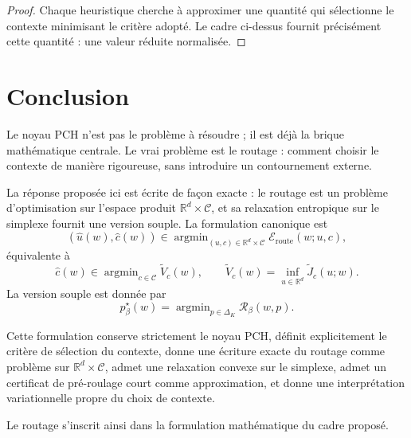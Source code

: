 \documentclass[11pt,a4paper]{article}
\DeclareMathOperator{\argmin}{argmin}
\newcommand{\R}{\mathbb R}
\newcommand{\Ccal}{\mathcal C}
\newcommand{\Rcal}{\mathcal R}
\begin{document}
\begin{proof}
Chaque heuristique cherche à approximer une quantité qui sélectionne le contexte minimisant le critère adopté. Le cadre ci-dessus fournit précisément cette quantité : une valeur réduite normalisée.
\end{proof}

\section{Conclusion}

Le noyau PCH n'est pas le problème à résoudre ; il est déjà la brique mathématique centrale. Le vrai problème est le routage : comment choisir le contexte de manière rigoureuse, sans introduire un contournement externe.

La réponse proposée ici est écrite de façon exacte : le routage est un problème d'optimisation sur l'espace produit \(\R^d\times\Ccal\), et sa relaxation entropique sur le simplexe fournit une version souple. La formulation canonique est
\[
(\hat u(w),\hat c(w))\in\argmin_{(u,c)\in\R^d\times\Ccal}\mathcal E_{\mathrm{route}}(w;u,c),
\]
équivalente à
\[
\hat c(w)\in\argmin_{c\in\Ccal}\widetilde V_c(w),
\qquad
\widetilde V_c(w)=\inf_{u\in\R^d}\widetilde J_c(u;w).
\]
La version souple est donnée par
\[
p^\star_\beta(w)
=
\argmin_{p\in\Delta_K}\Rcal_\beta(w,p).
\]

Cette formulation conserve strictement le noyau PCH, définit explicitement le critère de sélection du contexte, donne une écriture exacte du routage comme problème sur \(\R^d\times\Ccal\), admet une relaxation convexe sur le simplexe, admet un certificat de pré-roulage court comme approximation, et donne une interprétation variationnelle propre du choix de contexte.

Le routage s'inscrit ainsi dans la formulation mathématique du cadre proposé.
\end{document}
